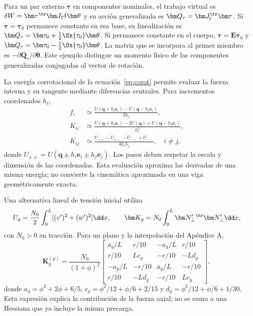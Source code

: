 Para un par externo $\bm\tau$ en componentes nominales, el trabajo virtual es $\delta W=\bm\tau^\tr\bm J_\ell\delta\bm\theta$ y su acción generalizada es $\bm Q_\tau=\bm J_\ell^\tr\bm\tau$. Si $\bm\tau=\bm\tau_0$ permanece constante en esa base, su linealización es $\bm Q_\tau=\bm\tau_0+\tfrac12\Sx{\tau_0}\bm\theta$. Si permanece constante en el cuerpo, $\bm\tau=\bm E\bm\tau_0$ y $\bm Q_\tau=\bm\tau_0-\tfrac12\Sx{\tau_0}\bm\theta$. La matriz que se incorpora al primer miembro es $-\partial\bm Q_\tau/\partial\bm\theta$. Este ejemplo distingue un momento físico de las componentes generalizadas conjugadas al vector de rotación.

La energía corrotacional de la ecuación~\eqref{eq:corot} permite evaluar la fuerza interna y su tangente mediante diferencias centrales. Para incrementos coordenados $h_i$,
\begin{align}
f_i&\simeq\frac{U(\bm q+h_i\bm e_i)-U(\bm q-h_i\bm e_i)}{2h_i},\nonumber\\
K_{ii}&\simeq\frac{U(\bm q+h_i\bm e_i)-2U(\bm q)+U(\bm q-h_i\bm e_i)}{h_i^2},\nonumber\\
K_{ij}&\simeq\frac{U_{++}-U_{+-}-U_{-+}+U_{--}}{4h_ih_j},\quad i\ne j,
\end{align}
donde $U_{\pm\pm}=U(\bm q\pm h_i\bm e_i\pm h_j\bm e_j)$. Los pasos deben respetar la escala y dimensión de las coordenadas. Esta evaluación aproxima las derivadas de una misma energía; no convierte la cinemática aproximada en una viga geométricamente exacta.

Una alternativa lineal de tensión inicial utiliza
\begin{equation}
U_g=\frac{N_0}2\int_0^L[(v')^2+(w')^2]\dd x,
\qquad \bm K_g=N_0\int_0^L\bm N_\perp'{}^\tr\bm N_\perp'\dd x,
\end{equation}
con $N_0>0$ en tracción. Para un plano y la interpolación del Apéndice A,
\begin{equation}
\bm K_g^{(p)}=\frac{N_0}{(1+\phi)^2}\begin{bmatrix}
a_g/L&r/10&-a_g/L&r/10\\
r/10&Lc_g&-r/10&-Ld_g\\
-a_g/L&-r/10&a_g/L&-r/10\\
r/10&-Ld_g&-r/10&Lc_g
\end{bmatrix},
\end{equation}
donde $a_g=\phi^2+2\phi+6/5$, $c_g=\phi^2/12+\phi/6+2/15$ y $d_g=\phi^2/12+\phi/6+1/30$. Esta expresión explica la contribución de la fuerza axial; no se suma a una Hessiana que ya incluye la misma precarga.

